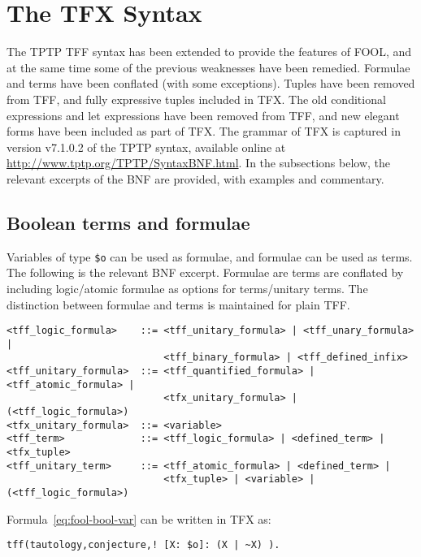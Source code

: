 \documentclass{easychair}
\begin{document}
\section{The TFX Syntax}
\label{TFX}

The TPTP TFF syntax has been extended to provide the features of FOOL,
and at the same time some of the previous weaknesses have been remedied.
Formulae and terms have been conflated (with some exceptions).
Tuples have been removed from TFF, and fully expressive tuples included in 
TFX. 
The old conditional expressions and let expressions have been removed from 
TFF, and new elegant forms have been included as part of TFX. 
The grammar of TFX is captured in version v7.1.0.2 of the TPTP syntax,
available online at \url{http://www.tptp.org/TPTP/SyntaxBNF.html}.
In the subsections below, the relevant excerpts of the BNF are provided,
with examples and commentary.

\subsection{Boolean terms and formulae}

Variables of type {\tt \$o} can be used as formulae, and formulae can be 
used as terms. 
The following is the relevant BNF excerpt.
Formulae are terms are conflated by including logic/atomic formulae as
options for terms/unitary terms.
The distinction between formulae and terms is maintained for plain TFF.
\begin{verbatim}
<tff_logic_formula>    ::= <tff_unitary_formula> | <tff_unary_formula> |
                           <tff_binary_formula> | <tff_defined_infix>
<tff_unitary_formula>  ::= <tff_quantified_formula> | <tff_atomic_formula> |
                           <tfx_unitary_formula> | (<tff_logic_formula>)
<tfx_unitary_formula>  ::= <variable>
<tff_term>             ::= <tff_logic_formula> | <defined_term> | <tfx_tuple>
<tff_unitary_term>     ::= <tff_atomic_formula> | <defined_term> |
                           <tfx_tuple> | <variable> | (<tff_logic_formula>)
\end{verbatim}

Formula~\ref{eq:fool-bool-var} can be written in TFX as:
\begin{verbatim}
tff(tautology,conjecture,! [X: $o]: (X | ~X) ).
\end{verbatim}
\end{document}

